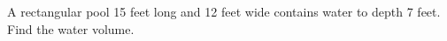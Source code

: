 A rectangular pool 15 feet long and 12 feet wide contains water to depth 7 feet. Find the water volume.
